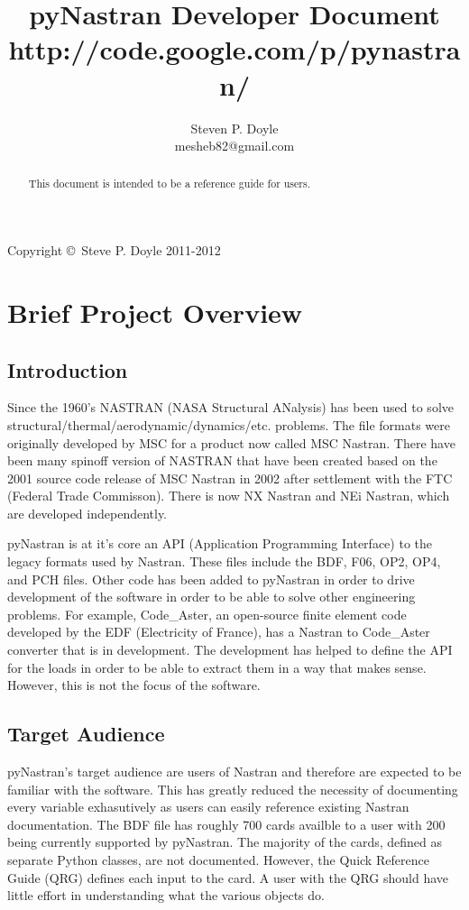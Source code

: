 
\title{pyNastran Developer Document \\
\small http://code.google.com/p/pynastran/ }
\author{Steven P. Doyle\\
{\small mesheb82@gmail.com}
}

\maketitle

\begin{abstract}
This document is intended to be a reference guide for users.
\end{abstract}

Copyright \copyright\ Steve P. Doyle 2011-2012
\newpage

\tableofcontents
\newpage

\section{Brief Project Overview}
  \subsection{Introduction}
      Since the 1960's NASTRAN (NASA Structural ANalysis) has been used to solve structural/thermal/aerodynamic/dynamics/etc. problems.  The file formats were originally developed by MSC for a product now called MSC Nastran.  There have been many spinoff version of NASTRAN that have been created based on the 2001 source code release of MSC Nastran in 2002 after settlement with the FTC (Federal Trade Commisson).  There is now NX Nastran and NEi Nastran, which are developed independently.
     
     pyNastran is at it's core an API (Application Programming Interface) to the legacy formats used by Nastran.  These files include the BDF, F06, OP2, OP4, and PCH files.  Other code has been added to pyNastran in order to drive development of the software in order to be able to solve other engineering problems.  For example, Code\_Aster, an open-source finite element code developed by the EDF (Electricity of France), has a Nastran to Code\_Aster converter that is in development.  The development has helped to define the API for the loads in order to be able to extract them in a way that makes sense.  However, this is not the focus of the software.

  \subsection{Target Audience}
      pyNastran's target audience are users of Nastran and therefore are expected to be familiar with the software.  This has greatly reduced the necessity of documenting every variable exhasutively as users can easily reference existing Nastran documentation.  The BDF file has roughly 700 cards availble to a user with 200 being currently supported by pyNastran.  The majority of the cards, defined as separate Python classes, are not documented.  However, the Quick Reference Guide (QRG) defines each input to the card.  A user with the QRG should have little effort in understanding what the various objects do.

